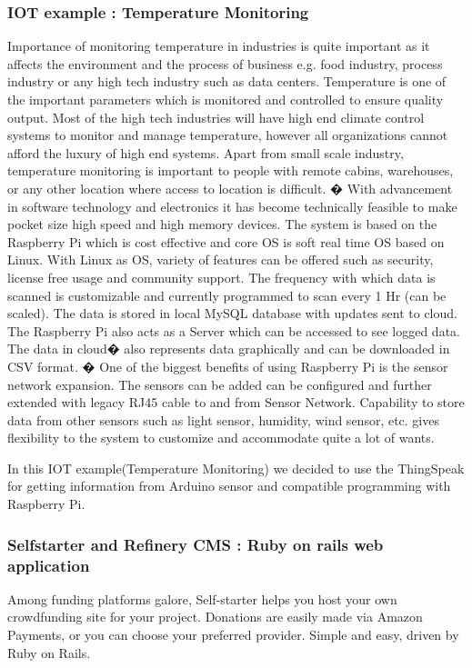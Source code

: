 \documentclass[conference]{IEEEtran}
\begin{document}
\subsubsection{IOT example : Temperature Monitoring}
 Importance of monitoring temperature in industries is quite important as it affects the environment and the process of business e.g. food industry, process industry or any high tech industry such as data centers. Temperature is one of the important parameters which is monitored and controlled to ensure quality output. Most of the high tech industries will have high end climate control systems to monitor and manage temperature, however all organizations cannot afford the luxury of high end systems. Apart from small scale industry, temperature monitoring is important to people with remote cabins, warehouses, or any other location where access to location is difficult.
�
With advancement in software technology and electronics it has become technically feasible to make pocket size high speed and high memory devices. The system is based on the Raspberry Pi which is cost effective and core OS is soft real time OS based on Linux. With Linux as OS, variety of features can be offered such as security, license free usage and community support. The frequency with which data is scanned is customizable and currently programmed to scan every 1 Hr (can be scaled). The data is stored in local MySQL database with updates sent to cloud. The Raspberry Pi also acts as a Server which can be accessed to see logged data. The data in cloud� also represents data graphically and can be downloaded in CSV format.
�
One of the biggest benefits of using Raspberry Pi is the sensor network expansion. The sensors can be added can be configured and further extended with legacy RJ45 cable to and from Sensor Network. Capability to store data from other sensors such as light sensor, humidity, wind sensor, etc. gives flexibility to the system to customize and accommodate quite a lot of wants.

In this IOT example(Temperature Monitoring) we decided to use the ThingSpeak for getting information from Arduino sensor and compatible programming with Raspberry Pi. 
\\
\subsubsection{Selfstarter and Refinery CMS : Ruby on rails web application}

Among funding platforms galore, Self-starter helps you host your own crowdfunding site for your project. Donations are easily made via Amazon Payments, or you can choose your preferred provider. Simple and easy, driven by Ruby on Rails.
\end{document}
